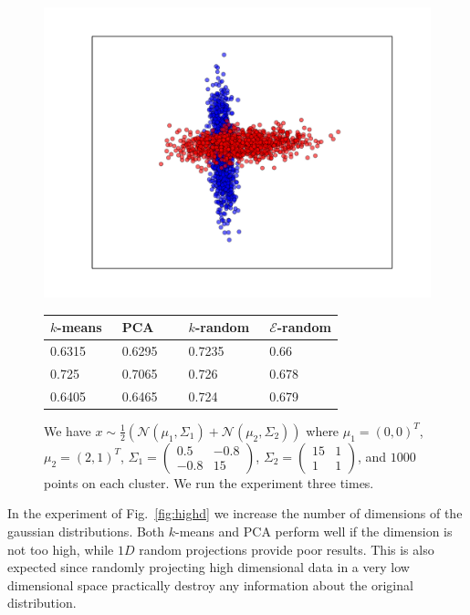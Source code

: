 \documentclass[aps,preprint,nofootinbib,floatfix]{revtex4-1}
\begin{document}
\begin{figure}
\begin{minipage}{.49\textwidth}
\includegraphics[scale=.45]{2d_weird1.pdf}
\end{minipage}
\begin{minipage}{.49\textwidth}
\begin{tabular}{ l l l l}
\hline
$k$-means~ & PCA~~~ & $k$-random~ & $\mathcal{E}$-random \\
\hline
0.6315 &
0.6295 &
0.7235 & 
0.66 \\
%
0.725 &
0.7065 &
0.726 &
0.678 \\
%
0.6405 &
0.6465 &
0.724 & 
0.679 \\
%
\hline
\end{tabular}
\end{minipage}
\caption{\label{fig:weird1}
We have $x \sim \tfrac{1}{2}\left( \mathcal{N}(\mu_1, \Sigma_1) +
\mathcal{N}(\mu_2, \Sigma_2)\right)$ where $\mu_1 = (0,0)^T$, $\mu_2=(2,1)^T$,
$\Sigma_1 = \left( \begin{smallmatrix} 0.5 & -0.8 \\ -0.8 & 15 
\end{smallmatrix}
\right)$,
$\Sigma_2 = \left( \begin{smallmatrix} 15 & 1 \\ 1 & 1 \end{smallmatrix}
\right)$,
and $1000$ points on each cluster. We run the experiment three times.
}
\end{figure}


In the experiment of Fig.~\ref{fig:highd} we increase the number of
dimensions of the gaussian distributions. Both $k$-means and PCA perform well
if the dimension is not too high, while $1D$ random projections provide
poor results. This is also expected since randomly projecting high dimensional
data in a very low dimensional space practically destroy any information
about the original distribution.
\end{document}
